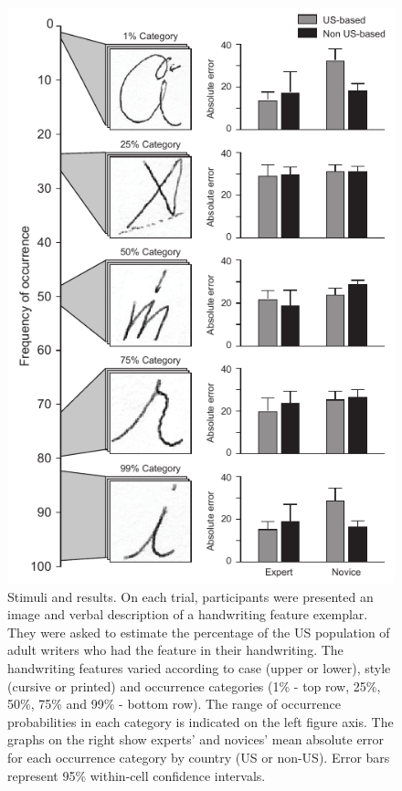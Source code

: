 \documentclass[doc]{apa6} %
\begin{document}
\begin{figure}[p]
\begin{center}
\includegraphics[scale=1]{handwritingexpertise.pdf}
\caption{Stimuli and results. On each trial, participants were presented an image and verbal description of a handwriting feature exemplar. They were asked to estimate the percentage of the US population of adult writers who had the feature in their handwriting. The handwriting features varied according to case (upper or lower), style (cursive or printed) and occurrence categories (1\% - top row, 25\%, 50\%, 75\% and 99\% - bottom row). The range of occurrence probabilities in each category is indicated on the left figure axis. The graphs on the right show experts' and novices' mean absolute error for each occurrence category by country (US or non-US). Error bars represent 95\% within-cell confidence intervals.}
\label{prettypic}
\end{center}
\end{figure}
\end{document}
